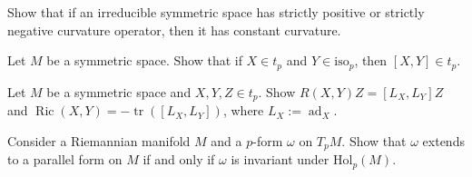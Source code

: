\begin{remark}
  \label{rem:pet-ch10-exercise-pinched-curvature-operator-constant}

  Show that if an irreducible symmetric space has strictly positive or strictly
  negative curvature operator, then it has constant curvature.
\end{remark}

\begin{remark}
  \label{rem:pet-ch10-exercise-bracket-tp-isop}

  Let $M$ be a symmetric space. Show that if $X\in t_p$ and $Y\in\mathrm{iso}_p$,
  then $[X,Y]\in t_p$.
\end{remark}

\begin{remark}
  \label{rem:pet-ch10-exercise-curvature-ricci-bracket-formula}

  Let $M$ be a symmetric space and $X,Y,Z\in t_p$. Show
  $R(X,Y)Z=[L_X,L_Y]Z$ and $\operatorname{Ric}(X,Y)=-\operatorname{tr}([L_X,L_Y])$, where
  $L_X:=\operatorname{ad}_X$.
\end{remark}

\begin{remark}
  \label{rem:pet-ch10-exercise-parallel-form-holonomy-invariant}

  Consider a Riemannian manifold $M$ and a $p$-form $\omega$ on $T_pM$. Show
  that $\omega$ extends to a parallel form on $M$ if and only if $\omega$ is
  invariant under $\mathrm{Hol}_p(M)$.
\end{remark}
